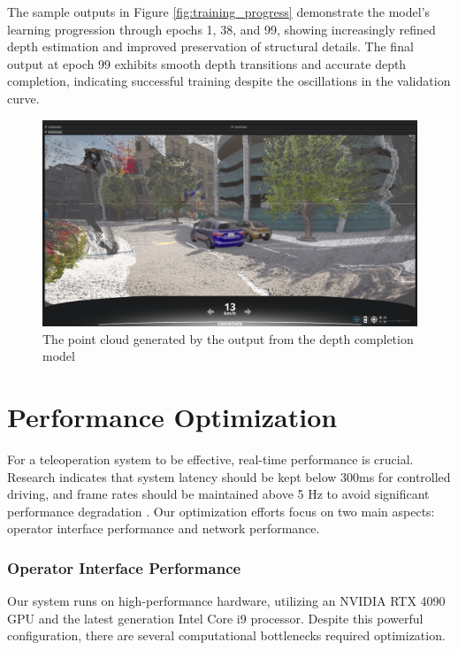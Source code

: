 The sample outputs in Figure \ref{fig:training_progress} demonstrate the model's learning progression through epochs 1, 38, and 99, showing increasingly refined depth estimation and improved preservation of structural details. The final output at epoch 99 exhibits smooth depth transitions and accurate depth completion, indicating successful training despite the oscillations in the validation curve.
\begin{figure}
    \centering
    \includegraphics[width=\textwidth, trim=0 150pt 0 50pt, clip]{figures/depth_comp.png}
    \caption{The point cloud generated by the output from the depth completion model}
    \label{fig:depth_completion_result}
\end{figure}

\section{Performance Optimization}

For a teleoperation system to be effective, real-time performance is crucial. Research indicates that system latency should be kept below 300ms for controlled driving, and frame rates should be maintained above 5 Hz to avoid significant performance degradation \cite{neumeier2023feasibility}. Our optimization efforts focus on two main aspects: operator interface performance and network performance.

\subsubsection{Operator Interface Performance}
Our system runs on high-performance hardware, utilizing an NVIDIA RTX 4090 GPU and the latest generation Intel Core i9 processor. Despite this powerful configuration, there are several computational bottlenecks required optimization.

